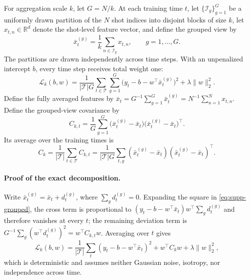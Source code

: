 \documentclass[10pt,conference]{IEEEtran}
\begin{document}
For aggregation scale $k$, let $G=N/k$. At each training time $t$, let
$\{\mathcal{I}_g\}_{g=1}^{G}$ be a uniformly drawn partition of the $N$ shot
indices into disjoint blocks of size $k$, let $x_{t,n}\in\mathbb{R}^d$ denote
the shot-level feature vector, and define the grouped view by
\begin{equation*}
  \bar{x}_t^{(g)}=\frac{1}{k}\sum_{n\in\mathcal{I}_g}x_{t,n},
  \qquad g=1,\dots,G.
\end{equation*}
The partitions are drawn independently across time steps. With an unpenalized
intercept $b$, every time step receives total weight one:
\begin{equation}
  \mathcal L_k(b,w)=\frac{1}{|\mathcal T|G}
  \sum_{t\in\mathcal T}\sum_{g=1}^{G}
  \bigl(y_t-b-w^\top\bar{x}_t^{(g)}\bigr)^2
  +\lambda\lVert w\rVert_2^2.
  \label{eq:supp-grouped}
\end{equation}
Define the fully averaged features by
$\bar{x}_t=G^{-1}\sum_{g=1}^{G}\bar{x}_t^{(g)}
=N^{-1}\sum_{n=1}^{N}x_{t,n}$. Define the grouped-view covariance by
\begin{equation*}
  C_{k,t}=\frac{1}{G}\sum_{g=1}^{G}
  \bigl(\bar{x}_t^{(g)}-\bar{x}_t\bigr)
  \bigl(\bar{x}_t^{(g)}-\bar{x}_t\bigr)^{\!\top}.
\end{equation*}
Its average over the training times is
\begin{equation}
  C_k=\frac{1}{|\mathcal T|}\sum_{t\in\mathcal T}C_{k,t}
  =\frac{1}{|\mathcal T|G}\sum_{t,g}
  (\bar{x}_t^{(g)}-\bar{x}_t)(\bar{x}_t^{(g)}-\bar{x}_t)^{\!\top}.
  \label{eq:supp-cov}
\end{equation}

\paragraph{Proof of the exact decomposition.}
Write $\bar{x}_t^{(g)}=\bar{x}_t+d_t^{(g)}$, where
$\sum_g d_t^{(g)}=0$.  Expanding the square in
\eqref{eq:supp-grouped}, the cross term is proportional to
$(y_t-b-w^\top\bar{x}_t)w^\top\sum_g d_t^{(g)}$ and therefore vanishes at every
$t$; the remaining deviation term is
$G^{-1}\sum_g(w^\top d_t^{(g)})^2=w^\top C_{k,t}w$.  Averaging over $t$ gives
\begin{equation}
  \mathcal L_k(b,w)=\frac{1}{|\mathcal T|}\sum_t
  (y_t-b-w^\top\bar{x}_t)^2+w^\top C_kw
  +\lambda\lVert w\rVert_2^2,
  \label{eq:supp-identity}
\end{equation}
which is deterministic and assumes neither Gaussian noise, isotropy, nor
independence across time.
\end{document}
